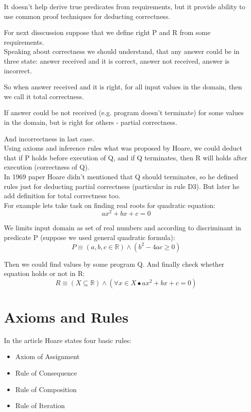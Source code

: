 \documentclass[twoside,twocolumn]{article}
\begin{document}
It doesn't help derive true predicates from requirements, but it
provide ability to use common proof techniques for deducting correctness.

For next disscussion suppose that we define right P and R from some
requirements. \\

Speaking about correctness we should understand, that any answer could be in
three state: answer received and it is correct, answer not received, answer is
incorrect.  

So when answer received and it is right, for all input values in the domain,
then we call it total correctness.

If answer could be not received (e.g. program doesn't terminate) for some values
in the domain, but is right for others - partial correctness.

And incorrectness in last case. \\

Using axioms and inference rules what was proposed by Hoare, we could deduct
that if P holds before execution of Q, and if Q terminates, then R will holds
after execution (correctness of Q).\\

In 1969 paper Hoare didn't mentioned that Q should terminates, so he defined
rules just for deducting partial correctness (particular in rule D3). But later
he add definition for total correctness too. \\

For example lets take task on finding real roots for quadratic equation:
$$ ax^2 + bx + c = 0$$

We limits input domain as set of real numbers and according to discriminant in
predicate P (suppose we used general quadratic formula):
$$ P \equiv (a, b, c \in \mathbb{R}) \wedge (b^2 - 4ac \geq 0)$$

Then we could find values by some program Q.
And finally check whether equation holds or not in R: 
$$ R \equiv (X \subseteq \mathbb{R}) \wedge (\forall x \in X \bullet ax^2 + bx + c
= 0)$$

\section{Axioms and Rules}

In the article Hoare states four basic rules:
\begin{itemize}
\item
  Axiom of Assignment
\item
  Rule of Consequence
\item
  Rule of Composition
\item
  Rule of Iteration
\end{itemize}
\end{document}
